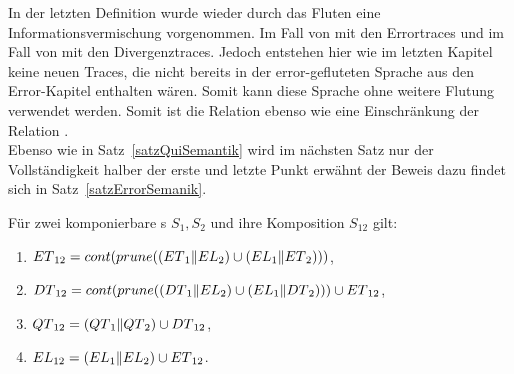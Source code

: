 In der letzten Definition wurde wieder durch das Fluten eine
Informationsvermischung vorgenommen. Im Fall von \DT{} mit den Errortraces und
im Fall von \QT{} mit den Divergenztraces. Jedoch entstehen hier wie im letzten
Kapitel keine neuen Traces, die nicht bereits in der error-gefluteten Sprache
\EL{} aus den Error-Kapitel enthalten wären. Somit kann diese Sprache ohne weitere
Flutung verwendet werden. Somit ist die Relation \DRel{} ebenso wie \QRel{}
eine Einschränkung der Relation \ERel{}.\\
Ebenso wie in Satz~\ref{satzQuiSemantik} wird im nächsten Satz nur der
Vollständigkeit halber der erste und letzte Punkt erwähnt der Beweis dazu
findet sich in Satz~\ref{satzErrorSemanik}.

\begin{satz}
  Für zwei komponierbare \EIO{}s $S_1, S_2$ und ihre Komposition
  $S_{12}$ gilt:
  \begin{enumerate}
    \item $ET{}_{12}=cont (prune ((ET{}_1\|EL{}_2)\cup
      (EL{}_1\|ET{}_2)))$,
    \item $DT{}_{12}=cont (prune ((DT{}_1\|EL{}_2)\cup
      (EL{}_1\|DT{}_2)))\cup ET{}_{12}$,
    \item $QT{}_{12}=(QT{}_1\|QT{}_2)\cup DT{}_{12}$,
    \item $EL{}_{12}=(EL{}_1\|EL{}_2)\cup ET{}_{12}$.
  \end{enumerate}
\end{satz}

